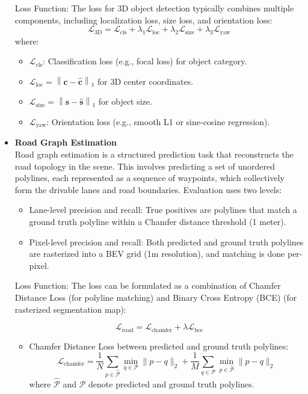 \documentclass{article} %
\begin{document}
\begin{itemize}
		Loss Function:
		The loss for 3D object detection typically combines multiple components, including localization loss, size loss, and orientation loss:
		\[
		\mathcal{L}_{\text{3D}} = \mathcal{L}_{\text{cls}} + \lambda_1 \mathcal{L}_{\text{loc}} + \lambda_2 \mathcal{L}_{\text{size}} + \lambda_3 \mathcal{L}_{\text{yaw}}
		\]
		where:
		\begin{itemize}
			\item \(\mathcal{L}_{\text{cls}}\): Classification loss (e.g., focal loss) for object category.
			\item \(\mathcal{L}_{\text{loc}} = \left\| \mathbf{c} - \hat{\mathbf{c}} \right\|_1\) for 3D center coordinates.
			\item \(\mathcal{L}_{\text{size}} = \left\| \mathbf{s} - \hat{\mathbf{s}} \right\|_1\) for object size.
			\item \(\mathcal{L}_{\text{yaw}}\): Orientation loss (e.g., smooth L1 or sine-cosine regression).
		\end{itemize}
		\item \textbf{Road Graph Estimation} 
		\\
		Road graph estimation is a structured prediction task that reconstructs the road topology in the scene. This involves predicting a set of unordered polylines, each represented as a sequence of waypoints, which collectively form the drivable lanes and road boundaries. Evaluation uses two levels:
		\begin{itemize}
			\item Lane-level precision and recall: True positives are polylines that match a ground truth polyline within a Chamfer distance threshold (1 meter).
			\item Pixel-level precision and recall: Both predicted and ground truth polylines are rasterized into a BEV grid (1m resolution), and matching is done per-pixel.
		\end{itemize}
		Loss Function:
		The loss can be formulated as a combination of Chamfer Distance Loss (for polyline matching) and Binary Cross Entropy (BCE) (for rasterized segmentation map):
		
		\[
		\mathcal{L}_{\text{road}} = \mathcal{L}_{\text{chamfer}} + \lambda \mathcal{L}_{\text{bce}}
		\]
		
		\begin{itemize}
			\item Chamfer Distance Loss between predicted and ground truth polylines:
			\[
			\mathcal{L}_{\text{chamfer}} = \frac{1}{N} \sum_{p \in \hat{\mathcal{P}}} \min_{q \in \mathcal{P}} \|p - q\|_2 + \frac{1}{M} \sum_{q \in \mathcal{P}} \min_{p \in \hat{\mathcal{P}}} \|p - q\|_2
			\]
			where \(\hat{\mathcal{P}}\) and \(\mathcal{P}\) denote predicted and ground truth polylines.
			

\end{itemize}
\end{itemize}
\end{document}
